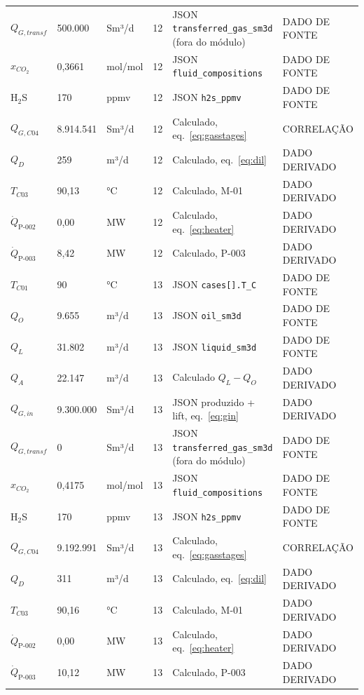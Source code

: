 \documentclass[11pt,a4paper]{article}
\numberwithin{equation}{section}
\numberwithin{table}{section}
\numberwithin{figure}{section}
\newcommand{\tipo}[1]{\textsf{\footnotesize #1}}
\begin{document}
{\begin{longtable}{L{3.6cm}L{2.2cm}lL{1.0cm}L{4.2cm}l}
$Q_{G,transf}$ & 500.000 & Sm³/d & 12 & JSON \texttt{transferred\_gas\_sm3d} (fora do módulo) & \tipo{DADO DE FONTE}\\
$x_{CO_2}$ & 0{,}3661 & mol/mol & 12 & JSON \texttt{fluid\_compositions} & \tipo{DADO DE FONTE}\\
H$_2$S & 170 & ppmv & 12 & JSON \texttt{h2s\_ppmv} & \tipo{DADO DE FONTE}\\
$Q_{G,C04}$ & 8.914.541 & Sm³/d & 12 & Calculado, eq.~\eqref{eq:gasstages} & \tipo{CORRELAÇÃO}\\
$Q_{D}$ & 259 & m³/d & 12 & Calculado, eq.~\eqref{eq:dil} & \tipo{DADO DERIVADO}\\
$T_{C03}$ & 90,13 & °C & 12 & Calculado, M-01 & \tipo{DADO DERIVADO}\\
$\dot Q_{\mbox{P-002}}$ & 0,00 & MW & 12 & Calculado, eq.~\eqref{eq:heater} & \tipo{DADO DERIVADO}\\
$\dot Q_{\mbox{P-003}}$ & 8,42 & MW & 12 & Calculado, P-003 & \tipo{DADO DERIVADO}\\
$T_{C01}$ & 90 & °C & 13 & JSON \texttt{cases[].T\_C} & \tipo{DADO DE FONTE}\\
$Q_{O}$ & 9.655 & m³/d & 13 & JSON \texttt{oil\_sm3d} & \tipo{DADO DE FONTE}\\
$Q_{L}$ & 31.802 & m³/d & 13 & JSON \texttt{liquid\_sm3d} & \tipo{DADO DE FONTE}\\
$Q_{A}$ & 22.147 & m³/d & 13 & Calculado $Q_L-Q_O$ & \tipo{DADO DERIVADO}\\
$Q_{G,in}$ & 9.300.000 & Sm³/d & 13 & JSON produzido + lift, eq.~\eqref{eq:gin} & \tipo{DADO DERIVADO}\\
$Q_{G,transf}$ & 0 & Sm³/d & 13 & JSON \texttt{transferred\_gas\_sm3d} (fora do módulo) & \tipo{DADO DE FONTE}\\
$x_{CO_2}$ & 0{,}4175 & mol/mol & 13 & JSON \texttt{fluid\_compositions} & \tipo{DADO DE FONTE}\\
H$_2$S & 170 & ppmv & 13 & JSON \texttt{h2s\_ppmv} & \tipo{DADO DE FONTE}\\
$Q_{G,C04}$ & 9.192.991 & Sm³/d & 13 & Calculado, eq.~\eqref{eq:gasstages} & \tipo{CORRELAÇÃO}\\
$Q_{D}$ & 311 & m³/d & 13 & Calculado, eq.~\eqref{eq:dil} & \tipo{DADO DERIVADO}\\
$T_{C03}$ & 90,16 & °C & 13 & Calculado, M-01 & \tipo{DADO DERIVADO}\\
$\dot Q_{\mbox{P-002}}$ & 0,00 & MW & 13 & Calculado, eq.~\eqref{eq:heater} & \tipo{DADO DERIVADO}\\
$\dot Q_{\mbox{P-003}}$ & 10,12 & MW & 13 & Calculado, P-003 & \tipo{DADO DERIVADO}\\

\end{longtable}}
\end{document}
